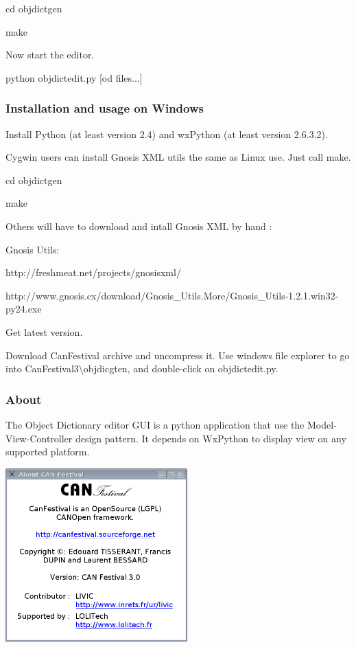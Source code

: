 \documentclass[a4paper,12pt]{book}
\begin{document}
{\ttfamily
cd objdictgen}

{\ttfamily
make}

Now start the editor.

{\ttfamily
python objdictedit.py [od files...]}

\subsubsection{Installation and usage on Windows}
Install Python (at least version 2.4) and wxPython (at least version
2.6.3.2).

Cygwin users can install Gnosis XML utils the same as Linux use. Just
call make.

{\ttfamily
cd objdictgen}

{\ttfamily
make}

Others will have to download and intall Gnosis XML by hand :

{\ttfamily
Gnosis Utils:}

{\ttfamily
http://freshmeat.net/projects/gnosisxml/}

{\ttfamily
http://www.gnosis.cx/download/Gnosis\_Utils.More/Gnosis\_Utils{}-1.2.1.win32{}-py24.exe}

{\ttfamily
Get latest version.}

Download CanFestival archive and uncompress it. Use windows file
explorer to go into CanFestival3{\textbackslash}objdicgten, and
double{}-click on objdictedit.py.

\subsubsection{About}
The Object Dictionary editor GUI is a python application that use the
Model{}-View{}-Controller design pattern. It depends on WxPython to
display view on any supported platform.

 \begin{center}
   \includegraphics[width=7cm]{Pictures/10000201000001FC000001E5D65E8766.png}
\end{center}
\end{document}
